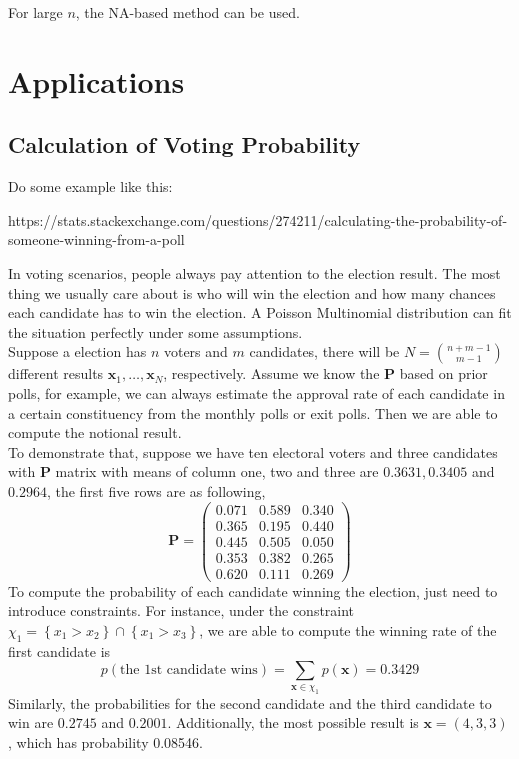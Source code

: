 \documentclass[12pt]{article}
\newcommand{\Pmat}{\mathbf{P}}
\begin{document}
For large $n$, the NA-based method can be used.

\section{Applications}
\subsection{Calculation of Voting Probability}


Do some example like this:

https://stats.stackexchange.com/questions/274211/calculating-the-probability-of-someone-winning-from-a-poll


In voting scenarios, people always pay attention to the election result. The most thing we usually care about is who will win the election and how many chances each candidate has to win the election. A Poisson Multinomial distribution can fit the situation perfectly under some assumptions.\\

Suppose a election has $n$ voters and $m$ candidates, there will be $N = \binom{n+m-1}{m-1}$ different results $\boldsymbol{x}_1,\dots, \boldsymbol{x}_N$, respectively. Assume we know the $\Pmat$ based on prior polls, for example, we can always estimate the approval rate of each candidate in a certain constituency from the monthly polls or exit polls. Then we are able to compute the notional result.\\

To demonstrate that, suppose we have ten electoral voters and three candidates with $\Pmat$ matrix with means of column one, two and three are $0.3631,0.3405$ and $0.2964$, the first five rows are as following,
\begin{equation*}
    \Pmat = \begin{pmatrix}
0.071 & 0.589 & 0.340\\
0.365 & 0.195 & 0.440\\
0.445 & 0.505 & 0.050\\
0.353 & 0.382 & 0.265\\
0.620 & 0.111 & 0.269
    \end{pmatrix}
\end{equation*}
To compute the probability of each candidate winning the election, just need to introduce constraints. For instance, under the constraint $\chi_1 = \left\{x_1>x_2\right\} \cap \left\{x_1>x_3\right\}$, we are able to compute the winning rate of the first candidate is
\begin{equation*}
    p(\text{the 1st candidate wins}) = \sum_{\boldsymbol{x} \in \chi_{1}} p(\boldsymbol{x}) = 0.3429
\end{equation*}
Similarly, the probabilities for the second candidate and the third candidate to win are $0.2745$ and $0.2001$. Additionally, the most possible result is $\boldsymbol{x} = (4,3,3)$, which has probability 0.08546.
\end{document}
